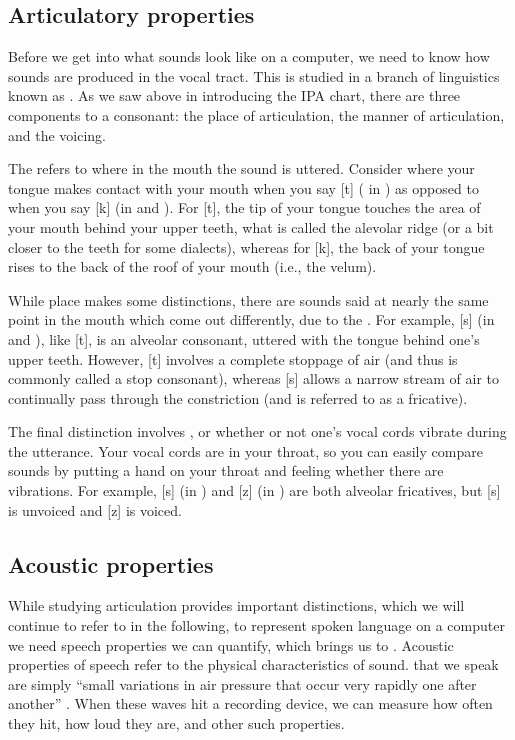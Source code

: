 \subsection{Articulatory properties}
\label{sec:articulation}

Before we get into what sounds look like on a computer, we need to
know how sounds are produced in the vocal tract.  This is studied in a branch of
linguistics known as .  As we saw above in introducing the IPA chart,
there are three components to a consonant: the
place of articulation, the manner of articulation, and the voicing.

The  refers to where in the mouth the
sound is uttered.  Consider where your tongue makes contact with your
mouth when you say {[t]} ( in ) as opposed to when you say
{[k]} (in  and ).  For {[t]}, the tip of your tongue touches the
area of your mouth behind your upper teeth, what is called the
alevolar ridge (or a bit closer to the teeth for some dialects), whereas for {[k]}, the back of your tongue
rises to the back of the roof of your mouth (i.e., the velum).

While place makes some distinctions, there are sounds said at nearly
the same point in the mouth which come out differently, due to the
.  For example, {[s]} (in  and  ), like
{[t]}, is an alveolar consonant, uttered with the tongue
behind one's upper teeth.  However, {[t]} involves a complete
stoppage of air (and thus is commonly called a stop consonant),
whereas {[s]} allows a narrow stream of air to continually
pass through the constriction (and is referred to as a fricative).

The final distinction involves , or whether or not
one's vocal cords vibrate during the utterance.  Your vocal cords are
in your throat, so you can easily compare sounds by putting a hand on
your throat and feeling whether there are vibrations.  For example,
{[s]} (in ) and {[z]} (in ) are both alveolar fricatives, but {[s]} is unvoiced and {[z]} is voiced.

\subsection{Acoustic properties}

While studying articulation provides important distinctions, which we
will continue to refer to in the following, to represent spoken
language on a computer we need speech properties we can quantify,
which brings us to .
Acoustic properties of speech refer to
the physical characteristics of sound.   that we
speak are simply ``small variations in air pressure that occur very
rapidly one after another'' \citep{LadefogedJohnson:2014}.  When these waves
hit a recording device, we can measure how often they hit, how loud
they are, and other such properties.

